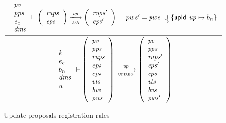 \begin{figure}[htb]
  \begin{equation}
    \label{eq:rule:upi-reg-interface}
    \inference
    {
      {
        \begin{array}{l}
          \var{pv}\\
          \var{pps}\\
          \var{e_c}\\
          \var{dms}
        \end{array}
      }
      \vdash
      {
        \left(
          \begin{array}{l}
            \var{rups}\\
            \var{eps}
          \end{array}
        \right)
      }
      \trans{upa}{\var{up}}
      {
        \left(
          \begin{array}{l}
            \var{rups'}\\
            \var{eps'}
          \end{array}
        \right)
      }
      &
      pws' = pws \unionoverride \{ \upId{up} \mapsto b_n\}
    }
    {
      {
        \begin{array}{l}
          k\\
          e_c\\
          b_n\\
          \var{dms}\\
          u
        \end{array}
      }
      \vdash
      {
        \left(
          \begin{array}{l}
            \var{pv}\\
            \var{pps}\\
            \var{rups}\\
            \var{eps}\\
            \var{cps}\\
            \var{vts}\\
            \var{bvs}\\
            \var{pws}
          \end{array}
        \right)
      }
      \trans{upireg}{\var{up}}
      {
        \left(
          \begin{array}{l}
            \var{pv}\\
            \var{pps}\\
            \var{rups'}\\
            \var{eps'}\\
            \var{cps}\\
            \var{vts}\\
            \var{bvs}\\
            \var{pws'}
          \end{array}
        \right)
      }
    }
  \end{equation}
  \caption{Update-proposals registration rules}
  \label{fig:rules:upi-reg-interface}
\end{figure}

